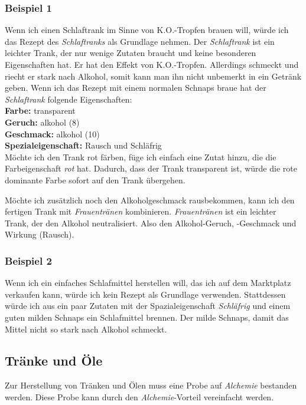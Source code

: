 \subsubsection{Beispiel 1}
Wenn ich einen Schlaftrank im Sinne von K.O.-Tropfen brauen will, würde ich das Rezept des \textit{Schlaftranks} als Grundlage nehmen. Der \textit{Schlaftrank} ist ein leichter Trank, der nur wenige Zutaten braucht und keine besonderen Eigenschaften hat. Er hat den Effekt von K.O.-Tropfen. Allerdings schmeckt und riecht er stark nach Alkohol, somit kann man ihn nicht unbemerkt in ein Getränk geben. Wenn ich das Rezept mit einem normalen Schnaps braue hat der \textit{Schlaftrank} folgende Eigenschaften:\\
\textbf{Farbe:} transparent \\
\textbf{Geruch:} alkohol (8) \\
\textbf{Geschmack:} alkohol (10) \\
\textbf{Spezialeigenschaft:} Rausch und Schläfrig \\

Möchte ich den Trank rot färben, füge ich einfach eine Zutat hinzu, die die Farbeigenschaft \textit{rot} hat. Dadurch, dass der Trank transparent ist, würde die rote dominante Farbe sofort auf den Trank übergehen. 

Möchte ich zusätzlich noch den Alkoholgeschmack rausbekommen, kann ich den fertigen Trank mit \textit{Frauentränen} kombinieren. \textit{Frauentränen} ist ein leichter Trank, der den Alkohol neutralisiert. Also den Alkohol-Geruch, -Geschmack und Wirkung (Rausch). 

\subsubsection{Beispiel 2}
Wenn ich ein einfaches Schlafmittel herstellen will, das ich auf dem Marktplatz verkaufen kann, würde ich kein Rezept als Grundlage verwenden. Stattdessen würde ich aus ein paar Zutaten mit der Spazialeigenschaft \textit{Schläfrig} und einem guten milden Schnaps ein Schlafmittel brennen. Der milde Schnaps, damit das Mittel nicht so stark nach Alkohol schmeckt. 

\subsection{Tränke und Öle}
Zur Herstellung von Tränken und Ölen muss eine Probe auf \textit{Alchemie} bestanden werden. Diese Probe kann durch den \textit{Alchemie}-Vorteil vereinfacht werden. 

